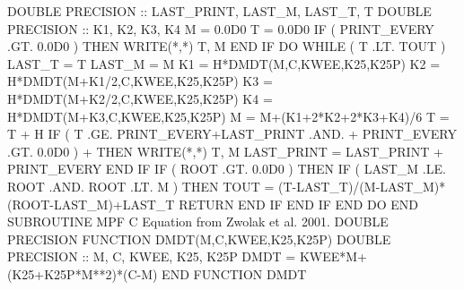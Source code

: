 {{          DOUBLE PRECISION :: LAST_PRINT, LAST_M, LAST_T, T
          DOUBLE PRECISION :: K1, K2, K3, K4
          M = 0.0D0
          T = 0.0D0
          IF ( PRINT_EVERY .GT. 0.0D0 ) THEN
              WRITE(*,*) T, M
          END IF
          DO WHILE ( T .LT. TOUT )
              LAST_T = T
              LAST_M = M
              K1 = H*DMDT(M,C,KWEE,K25,K25P)
              K2 = H*DMDT(M+K1/2,C,KWEE,K25,K25P)
              K3 = H*DMDT(M+K2/2,C,KWEE,K25,K25P)
              K4 = H*DMDT(M+K3,C,KWEE,K25,K25P)
              M = M+(K1+2*K2+2*K3+K4)/6
              T = T + H
              IF ( T .GE. PRINT_EVERY+LAST_PRINT .AND. 
     +            PRINT_EVERY .GT. 0.0D0 )             
     +        THEN
                  WRITE(*,*) T, M
                  LAST_PRINT = LAST_PRINT + PRINT_EVERY
              END IF
              IF ( ROOT .GT. 0.0D0 ) THEN
                  IF ( LAST_M .LE. ROOT .AND. ROOT .LT. M ) THEN
                      TOUT = (T-LAST_T)/(M-LAST_M)*(ROOT-LAST_M)+LAST_T
                      RETURN
                  END IF
              END IF
          END DO
      END SUBROUTINE MPF
\phantom{blank line}
\phantom{blank line}
C  Equation from Zwolak et al. 2001.
      DOUBLE PRECISION FUNCTION DMDT(M,C,KWEE,K25,K25P)
          DOUBLE PRECISION :: M, C, KWEE, K25, K25P
          DMDT = KWEE*M+(K25+K25P*M**2)*(C-M)
      END FUNCTION DMDT
}}
\vfil\eject

